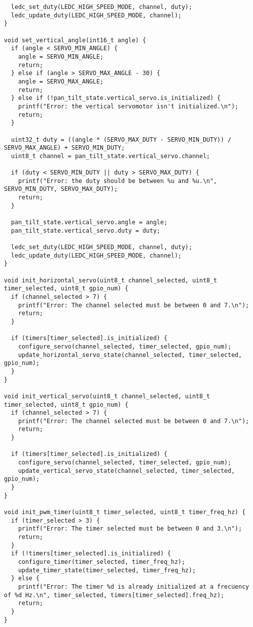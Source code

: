 \begin{lstlisting}
  ledc_set_duty(LEDC_HIGH_SPEED_MODE, channel, duty);
  ledc_update_duty(LEDC_HIGH_SPEED_MODE, channel);  
}

void set_vertical_angle(int16_t angle) {
  if (angle < SERVO_MIN_ANGLE) {
    angle = SERVO_MIN_ANGLE;
    return;
  } else if (angle > SERVO_MAX_ANGLE - 30) {
    angle = SERVO_MAX_ANGLE;
    return;
  } else if (!pan_tilt_state.vertical_servo.is_initialized) {
    printf("Error: the vertical servomotor isn't initialized.\n");
    return;
  }

  uint32_t duty = ((angle * (SERVO_MAX_DUTY - SERVO_MIN_DUTY)) / SERVO_MAX_ANGLE) + SERVO_MIN_DUTY;
  uint8_t channel = pan_tilt_state.vertical_servo.channel;

  if (duty < SERVO_MIN_DUTY || duty > SERVO_MAX_DUTY) {
    printf("Error: the duty should be between %u and %u.\n", SERVO_MIN_DUTY, SERVO_MAX_DUTY);
    return;
  }

  pan_tilt_state.vertical_servo.angle = angle;
  pan_tilt_state.vertical_servo.duty = duty;

  ledc_set_duty(LEDC_HIGH_SPEED_MODE, channel, duty);
  ledc_update_duty(LEDC_HIGH_SPEED_MODE, channel);  
}

void init_horizontal_servo(uint8_t channel_selected, uint8_t timer_selected, uint8_t gpio_num) {
  if (channel_selected > 7) {
    printf("Error: The channel selected must be between 0 and 7.\n");
    return;
  }

  if (timers[timer_selected].is_initialized) {
    configure_servo(channel_selected, timer_selected, gpio_num);
    update_horizontal_servo_state(channel_selected, timer_selected, gpio_num);
  }
}

void init_vertical_servo(uint8_t channel_selected, uint8_t timer_selected, uint8_t gpio_num) {
  if (channel_selected > 7) {
    printf("Error: The channel selected must be between 0 and 7.\n");
    return;
  }

  if (timers[timer_selected].is_initialized) {
    configure_servo(channel_selected, timer_selected, gpio_num);
    update_vertical_servo_state(channel_selected, timer_selected, gpio_num);
  }
}

void init_pwm_timer(uint8_t timer_selected, uint8_t timer_freq_hz) {
  if (timer_selected > 3) {
    printf("Error: The timer selected must be between 0 and 3.\n");
    return;
  }
  if (!timers[timer_selected].is_initialized) {
    configure_timer(timer_selected, timer_freq_hz);
    update_timer_state(timer_selected, timer_freq_hz);
  } else {
    printf("Error: The timer %d is already initialized at a frecuency of %d Hz.\n", timer_selected, timers[timer_selected].freq_hz);
    return;
  }
}


\end{lstlisting}
